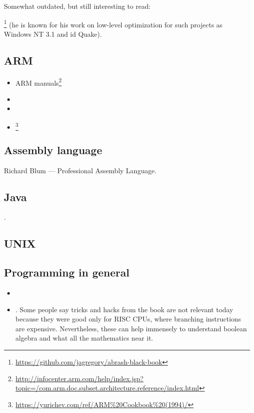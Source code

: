 Somewhat outdated, but still interesting to read:

\MAbrash\footnote{\AlsoAvailableAs \url{https://github.com/jagregory/abrash-black-book}}
(he is known for his work on low-level optimization for such projects as Windows NT 3.1 and id Quake).

\subsection{ARM}

\begin{itemize}
\item ARM manuals\footnote{\AlsoAvailableAs \url{http://infocenter.arm.com/help/index.jsp?topic=/com.arm.doc.subset.architecture.reference/index.html}}

\item \ARMSevenRef

\item \ARMSixFourRefURL

\item \ARMCookBook\footnote{\AlsoAvailableAs \url{https://yurichev.com/ref/ARM%20Cookbook%20(1994)/}}
\end{itemize}

\subsection{Assembly language}

Richard Blum --- Professional Assembly Language.

\subsection{Java}

\JavaBook.

\subsection{UNIX}

\TAOUP

\subsection{Programming in general}

\begin{itemize}

\item \RobPikePractice

\item \HenryWarren.
Some people say tricks and hacks from the book are not relevant today because they were good only for \ac{RISC} \ac{CPU}s,
where branching instructions are expensive.
Nevertheless, these can help immensely to understand boolean algebra and what all the mathematics near it.

\end{itemize}




